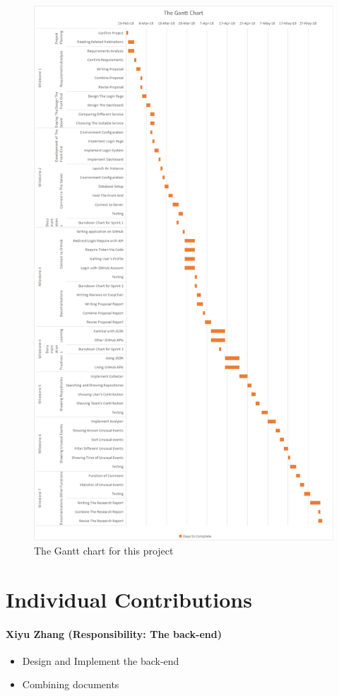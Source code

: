 \documentclass[conference]{IEEEtran}
\begin{document}
\begin{figure}[!ht]
\centering
\includegraphics[scale=0.35]{The_Gantt_Chart}
\caption{The Gantt chart for this project}
\end{figure}


\section{Individual Contributions}


\paragraph{\textbf{Xiyu Zhang (Responsibility: The back-end)}}
\medskip
\begin{itemize}
\item Design and Implement the back-end
\item Combining documents
\end{itemize}
\bigskip
\end{document}
